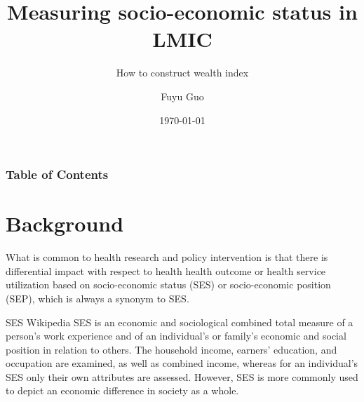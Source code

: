 \documentclass[13pt]{beamer}
\title[Wealth index ]{Measuring socio-economic status in LMIC}
\subtitle{How to construct wealth index}
\date{\today}
\author{Fuyu Guo}
\begin{document}
\begin{frame}
	\titlepage
\end{frame}

\begin{frame}
	\frametitle{Table of Contents}
	\tableofcontents
\end{frame}
\section{Background}
\begin{frame}
	What is common to health research and policy intervention is that there is differential impact with respect to health health outcome or health service utilization based on socio-economic status (SES) or socio-economic position (SEP), which is always a synonym to SES.
	\begin{block}{SES Wikipedia}
		SES is an economic and sociological combined total measure of a person's work experience and of an individual's or family's economic and social position in relation to others. The household income, earners' education, and occupation are examined, as well as combined income, whereas for an individual's SES only their own attributes are assessed. However, SES is more commonly used to depict an economic difference in society as a whole.
	\end{block}
\end{frame}
\end{document}
